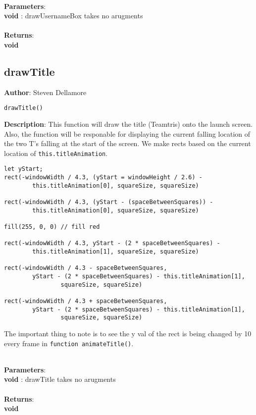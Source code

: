 \documentclass[12pt]{article}
\begin{document}
\textbf{\large{\\Parameters}}:\\
\textbf{void }: drawUsernameBox takes no arugments\\\textbf{\large{\\Returns}}:\\
\textbf{void}

\subsection{drawTitle}
\textbf{Author}: Steven Dellamore 
\vspace*{1\baselineskip}
\begin{lstlisting}
drawTitle()
\end{lstlisting} 
\vspace*{1\baselineskip}
\textbf{Description}: This function will draw the title (Teamtris) onto the launch screen. Also, the function will be responable for displaying the current falling location of the two T's falling at the start of the screen. We make rects based on the current location of \texttt{this.titleAnimation}. 
\begin{verbatim}
let yStart;
rect(-windowWidth / 4.3, (yStart = windowHeight / 2.6) - 
		this.titleAnimation[0], squareSize, squareSize) 

rect(-windowWidth / 4.3, (yStart - (spaceBetweenSquares)) - 
		this.titleAnimation[0], squareSize, squareSize) 

fill(255, 0, 0) // fill red

rect(-windowWidth / 4.3, yStart - (2 * spaceBetweenSquares) - 
		this.titleAnimation[1], squareSize, squareSize)

rect(-windowWidth / 4.3 - spaceBetweenSquares, 
		yStart - (2 * spaceBetweenSquares) - this.titleAnimation[1], 
				squareSize, squareSize)

rect(-windowWidth / 4.3 + spaceBetweenSquares, 
		yStart - (2 * spaceBetweenSquares) - this.titleAnimation[1], 
				squareSize, squareSize)
\end{verbatim}
 The important thing to note is to see the y val of the rect is being changed by 10 every frame in \texttt{function animateTitle()}. 


\textbf{\large{\\Parameters}}:\\
\textbf{void }: drawTitle takes no arugments\\\textbf{\large{\\Returns}}:\\
\textbf{void}
\end{document}
